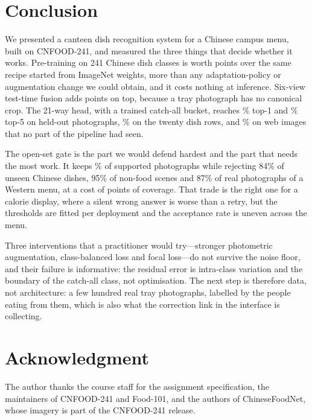 \documentclass[conference]{IEEEtran}
\begin{document}
\section{Conclusion}
We presented a canteen dish recognition system for a Chinese campus menu, built
on CNFOOD-241, and measured the three things that decide whether it works.
Pre-training on 241 Chinese dish classes is worth \cnGainPretrain{} points over
the same recipe started from ImageNet weights, more than any adaptation-policy or
augmentation change we could obtain, and it costs nothing at inference. Six-view
test-time fusion adds \cnFuseGain{} points on top, because a tray photograph has
no canonical crop. The 21-way head, with a trained catch-all bucket, reaches
\cnFuseTop\% top-1 and \cnFuseTopFive\% top-5 on \cnTestN{} held-out photographs,
\cnDishAcc\% on the twenty dish rows, and \webTop\% on \webN{} web images that no
part of the pipeline had seen.

The open-set gate is the part we would defend hardest and the part that needs the
most work. It keeps \gateIn\% of supported photographs while rejecting 84\% of
unseen Chinese dishes, 95\% of non-food scenes and 87\% of real photographs of a
Western menu, at a cost of \gateInCost{} points of coverage. That trade is the
right one for a calorie display, where a silent wrong answer is worse than a
retry, but the thresholds are fitted per deployment and the acceptance rate is
uneven across the menu.

Three interventions that a practitioner would try---stronger photometric
augmentation, class-balanced loss and focal loss---do not survive the noise floor,
and their failure is informative: the residual error is intra-class variation and
the boundary of the catch-all class, not optimisation. The next step is therefore
data, not architecture: a few hundred real tray photographs, labelled by the
people eating from them, which is also what the correction link in the interface
is collecting.

\section*{Acknowledgment}
The author thanks the course staff for the assignment specification, the
maintainers of CNFOOD-241 and Food-101, and the authors of ChineseFoodNet, whose
imagery is part of the CNFOOD-241 release.



\end{document}
